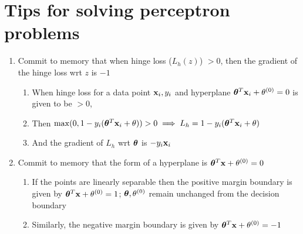 \section {Tips for solving perceptron problems}
\begin {enumerate}
\item Commit to memory that when hinge loss ($L_h(z)$) $> 0$, then the gradient of the hinge loss wrt $z$ is $-1$
  \begin {enumerate}
  \item When hinge loss for a data point $\mathbf{x}_i, y_i$ and hyperplane $\bm{\theta}^T \mathbf{x}_i + \mathrm{\theta^{(0)}} = 0$ is given to be $> 0$, 
  \item Then $\max(0, 1 - y_i(\bm{\theta}^T \mathbf{x}_i + \theta)) > 0 \implies L_h = 1 - y_i(\bm{\theta}^T \mathbf{x}_i + \theta)$
  \item And the gradient of $L_h$ wrt $\bm{\theta}$ is $- y_i \mathbf{x}_i$
  \end {enumerate}
\item Commit to memory that the form of a hyperplane is $\bm{\theta}^T \mathbf{x} + \mathrm{\theta^{(0)}} = 0$
  \begin {enumerate}
  \item If the points are linearly separable then the positive margin boundary is given by $\bm{\theta}^T \mathbf{x} + \mathrm{\theta^{(0)}} = 1$; $\bm{\theta}, \mathrm{\theta^{(0)}}$ remain unchanged from the decision boundary
  \item Similarly, the negative margin boundary is given by $\bm{\theta}^T \mathbf{x} + \mathrm{\theta^{(0)}} = -1$
  \end {enumerate}
\end {enumerate}

